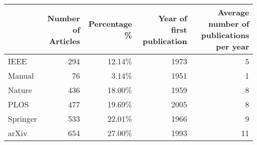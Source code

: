 \begin{tabular}{lrrrr}
\toprule
{} &  Number of Articles &  Percentage \% &  Year of first publication &  Average number of publications per year\\
\midrule
IEEE     &               294 &       12.14\% &                    1973 &                             5\\
Manual   &                76 &        3.14\% &                    1951 &                             1\\
Nature   &               436 &       18.00\% &                    1959 &                             8\\
PLOS     &               477 &       19.69\% &                    2005 &                             8\\
Springer &               533 &       22.01\% &                    1966 &                             9\\
arXiv    &               654 &       27.00\% &                    1993 &                            11\\
\bottomrule
\end{tabular}
